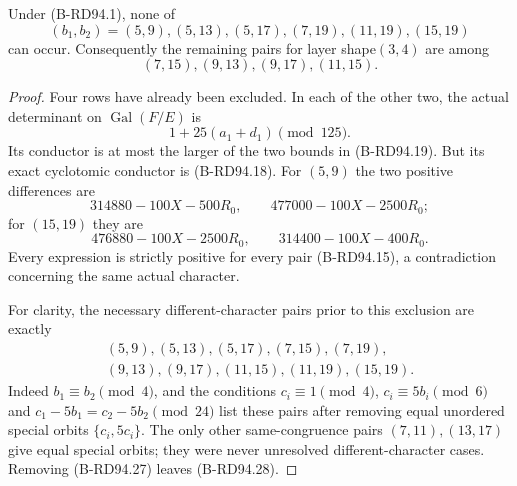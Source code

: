 \begin{theorem}
\label{thm:B-RD94-six-rows}
Under (B-RD94.1), none of
\[
 (b_1,b_2)=(5,9),(5,13),(5,17),(7,19),(11,19),(15,19)
                                                        \tag{B-RD94.27}
\]
can occur. Consequently the remaining pairs for layer shape$(3,4)$
are among
\[
                       (7,15),(9,13),(9,17),(11,15).  \tag{B-RD94.28}
\]
\end{theorem}
\begin{proof}
Four rows have already been excluded. In each of the other two,
the actual determinant on $\operatorname{Gal}(F/E)$ is
\[
                        1+25(a_1+d_1)\pmod{125}.
\]
Its conductor is at most the larger of the two bounds in
(B-RD94.19). But its exact cyclotomic conductor is (B-RD94.18).
For $(5,9)$ the two positive differences are
\[
 314880-100X-500R_0,\qquad477000-100X-2500R_0;
\]
for $(15,19)$ they are
\[
 476880-100X-2500R_0,\qquad314400-100X-400R_0.
\]
Every expression is strictly positive for every pair
(B-RD94.15), a contradiction concerning the same actual character.

For clarity, the necessary different-character pairs prior to this
exclusion are exactly
\[
\begin{gathered}
 (5,9),(5,13),(5,17),(7,15),(7,19),\\
 (9,13),(9,17),(11,15),(11,19),(15,19).
\end{gathered}
\]
Indeed $b_1\equiv b_2\pmod4$, and the conditions
$c_i\equiv1\pmod4$, $c_i\equiv5b_i\pmod6$ and
$c_1-5b_1=c_2-5b_2\pmod{24}$ list these pairs after removing
equal unordered special orbits $\{c_i,5c_i\}$. The only other
same-congruence pairs $(7,11),(13,17)$ give equal special orbits;
they were never unresolved different-character cases. Removing
(B-RD94.27) leaves (B-RD94.28).
\end{proof}

